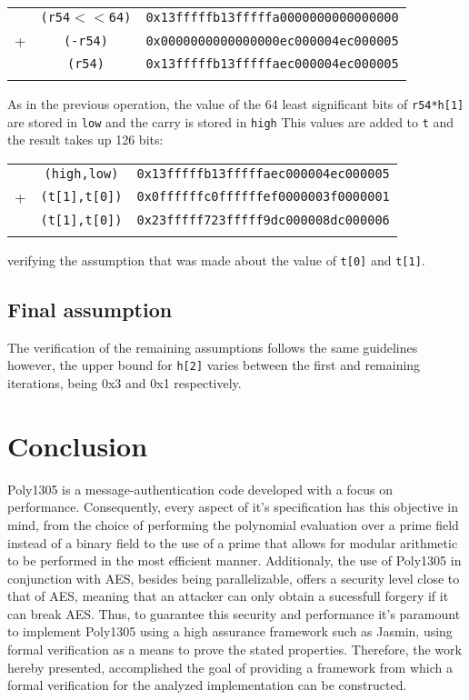\documentclass{article}
\begin{document}
\begin{tabular}{c c c}
\\
    &  \texttt{(r54$<<$64)}     &\texttt{0x13fffffb13fffffa0000000000000000} \\
+   &  \texttt{(-r54)}          &\texttt{0x0000000000000000ec000004ec000005} \\
\hline
    &  \texttt{(r54)}           &\texttt{0x13fffffb13fffffaec000004ec000005} \\
\\
\end{tabular}


As in the previous operation, the value of the 64 least significant bits of \texttt{r54*h[1]} are stored in \texttt{low} and the carry is stored in \texttt{high}
This values are added to \texttt{t} and the result takes up 126 bits:

\begin{tabular}{c c c}
\\
    &  \texttt{(high,low)}       &\texttt{0x13fffffb13fffffaec000004ec000005}\\
+   &  \texttt{(t[1],t[0])}      &\texttt{0x0ffffffc0ffffffef0000003f0000001}\\
\hline
    & \texttt{(t[1],t[0])}       &\texttt{0x23fffff723fffff9dc000008dc000006}\\
\\
\end{tabular}

verifying the assumption that was made about the value of \texttt{t[0]} and \texttt{t[1]}.

\subsection{Final assumption}
The verification of the remaining assumptions follows the same guidelines however, the upper bound for \texttt{h[2]} varies between the first and remaining 
iterations, being 0x3 and 0x1 respectively.

\section{Conclusion}
Poly1305 is a message-authentication code developed with a focus on performance. Consequently, every aspect of it's specification has this objective 
in mind, from the choice of performing the polynomial evaluation over a prime field instead of a binary field to the use of a prime that allows for modular 
arithmetic to be performed in the most efficient manner. Additionaly, the use of Poly1305 in conjunction with AES, besides being parallelizable, offers a 
security level close to that of AES, meaning that an attacker can only obtain a sucessfull forgery if it can break AES. 
Thus, to guarantee this security and performance it's paramount to implement Poly1305 using a high assurance framework such as Jasmin, using formal verification
as a means to prove the stated properties. Therefore, the work hereby presented, accomplished the goal of providing a framework from which a formal verification 
for the analyzed implementation can be constructed.
\printbibliography
\end{document}
